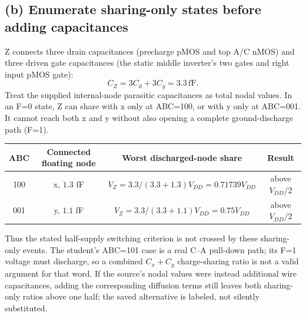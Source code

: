 \documentclass[10pt]{article}
\begin{document}
\subsection*{(b) Enumerate sharing-only states before adding capacitances}
Z connects three drain capacitances (precharge pMOS and top A/C nMOS) and three driven gate capacitances (the static middle inverter's two gates and right input pMOS gate):
\[C_Z=3C_d+3C_g=3.3\,\mathrm{fF}.\]
Treat the supplied internal-node parasitic capacitances as total nodal values. In an F=0 state, Z can share with x only at ABC=100, or with y only at ABC=001. It cannot reach both x and y without also opening a complete ground-discharge path (F=1).
\begin{center}\begin{tabular}{cccc}\toprule ABC&Connected floating node&Worst discharged-node share&Result\\\midrule
100&x, $1.3$ fF&$V_Z=3.3/(3.3+1.3)V_{DD}=0.71739V_{DD}$&above $V_{DD}/2$\\
001&y, $1.1$ fF&$V_Z=3.3/(3.3+1.1)V_{DD}=0.75V_{DD}$&above $V_{DD}/2$\\\bottomrule\end{tabular}\end{center}
Thus the stated half-supply switching criterion is not crossed by these sharing-only events. The student's ABC=101 case is a real C--A pull-down path; its F=1 voltage must discharge, so a combined $C_x+C_y$ charge-sharing ratio is not a valid argument for that word. If the source's nodal values were instead additional wire capacitances, adding the corresponding diffusion terms still leaves both sharing-only ratios above one half; the saved alternative is labeled, not silently substituted.
\end{document}
